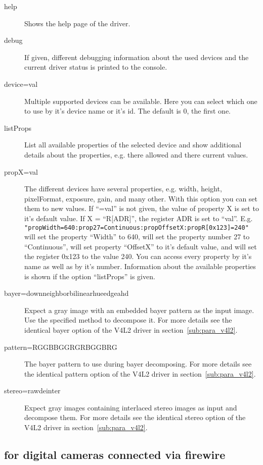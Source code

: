 \begin{description}
\item[help] Shows the help page of the driver.
\item[debug] If given, different debugging information about the
  used devices and the current driver status is printed to the
  console.
\item[device=val] Multiple supported devices can be available. Here
  you can select which one to use by it's device name or it's
  id. The default is 0, the first one.
\item[listProps] List all available properties of the selected
  device and show additional details about the properties,
  e.g. there allowed and there current values.
\item[propX=val] The different devices have several properties,
  e.g. width, height, pixelFormat, exposure, gain, and many
  other. With this option you can set them to new values. If
  ``=val'' is not given, the value of property X is set to
  it's default value. If X = ``R[ADR]'', the register ADR is set to
  ``val''. E.g. \verb|"propWidth=640:prop27=Continuous:propOffsetX:propR[0x123]=240"|
  will set the property ``Width'' to 640, will set the property
  number 27 to ``Continuous'', will set property ``OffsetX'' to it's
  default value, and will set the register 0x123 to the value
  240. You can access every property by it's name as well as by it's
  number. Information about the available properties is shown if the
  option ``listProps'' is given.
\item[bayer=down\textbar{}neighbor\textbar{}bilinear\textbar{}hue\textbar{}edge\textbar{}ahd]
  Expect a gray image with an embedded bayer pattern as the input
  image. Use the specified method to decompose it. For more details
  see the identical bayer option of the V4L2 driver in
  section~\ref{sub:para_v4l2}.
\item[pattern=RGGB\textbar{}BGGR\textbar{}GRBG\textbar{}GBRG]
  The bayer pattern to use during bayer decomposing. For more
  details see the identical pattern option of the V4L2 driver in
  section~\ref{sub:para_v4l2}.
\item[stereo=raw\textbar{}deinter] Expect gray images containing
  interlaced stereo images as input and decompose them. For more
  details see the identical stereo option of the V4L2 driver in
  section~\ref{sub:para_v4l2}.
\end{description}

\subsection { for digital cameras connected
  via firewire}

